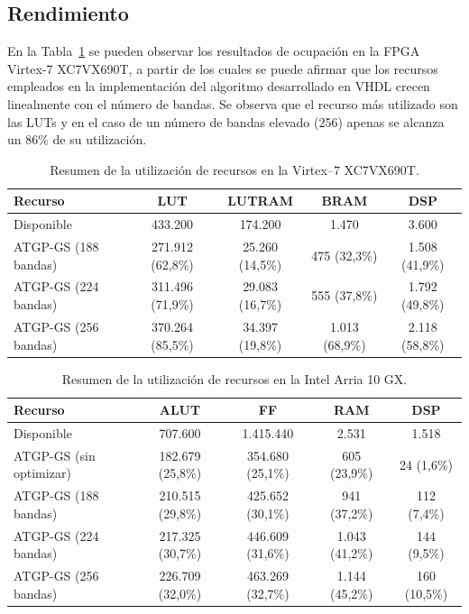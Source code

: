 \subsection{Rendimiento}

En la Tabla~\ref{utilization virtex7} se pueden observar los resultados de ocupación en la FPGA Virtex-7 XC7VX690T, a partir de los cuales se puede afirmar que los recursos empleados en la implementación del algoritmo desarrollado en VHDL crecen linealmente con el número de bandas. Se observa que el recurso más utilizado son las LUTs y en el caso de un número de bandas elevado (256) apenas se alcanza un 86\% de su utilización.

\begin{table}[htb]\small
	\centering
	\begin{tabular}{|l|c|c|c|c|}
		\hline
		Recurso & LUT & LUTRAM & BRAM & DSP \\ \hline \hline
		Disponible & 433.200 & 174.200 & 1.470 & 3.600 \\ \hline 
		ATGP-GS (188 bandas)  & 271.912 (62,8\%) & 25.260 (14,5\%) & 475 (32,3\%) & 1.508 (41,9\%)  \\ \hline 
		ATGP-GS (224 bandas) & 311.496 (71,9\%) & 29.083 (16,7\%) & 555 (37,8\%) & 1.792 (49,8\%) \\ \hline 
		ATGP-GS (256 bandas) & 370.264 (85,5\%) & 34.397 (19,8\%) & 1.013 (68,9\%) & 2.118 (58,8\%)  \\ \hline
	\end{tabular}
	\caption{Resumen de la utilización de recursos en la Virtex--7 XC7VX690T.}
	\label{utilization virtex7}
\end{table}

\begin{table}[htb]\small
	\centering
	\begin{tabular}{|l|c|c|c|c|}
		\hline
		Recurso & ALUT & FF & RAM & DSP \\ \hline \hline
		Disponible & 707.600 & 1.415.440 & 2.531 & 1.518\\ \hline 
		ATGP-GS (sin optimizar) & 182.679 (25,8\%) & 354.680 (25,1\%) & 605 (23,9\%) & 24 (1,6\%)\\ \hline 
		ATGP-GS (188 bandas) & 210.515 (29,8\%) & 425.652 (30,1\%) & 941 (37,2\%) &  112 (7,4\%)\\ \hline
		ATGP-GS (224 bandas) & 217.325 (30,7\%) & 446.609 (31,6\%) & 1.043 (41,2\%) & 144 (9,5\%)\\ \hline
		ATGP-GS (256 bandas) & 226.709 (32,0\%) & 463.269 (32,7\%) & 1.144 (45,2\%) & 160 (10,5\%)\\ \hline
	\end{tabular}
	\caption{Resumen de la utilización de recursos en la Intel Arria 10 GX.}
	\label{utilization intel arria 10 gx}
\end{table}

